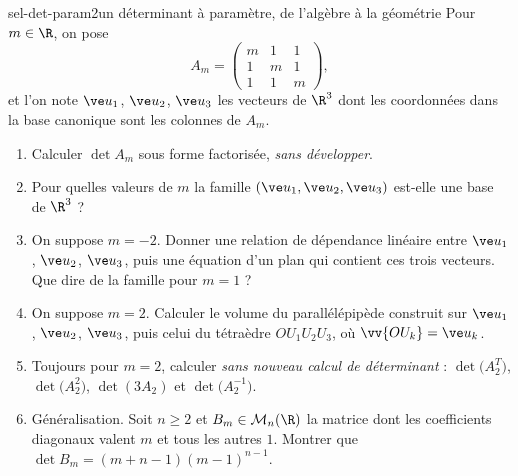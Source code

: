 
\begin{exo}{sel-det-param}{2}{un déterminant à paramètre, de l'algèbre à la géométrie}
Pour $m\in\R$, on pose
\[A_m=\begin{pmatrix}m&1&1\\1&m&1\\1&1&m\end{pmatrix},\]
et l'on note $\ve u_1$, $\ve u_2$, $\ve u_3$ les vecteurs de $\R^3$ dont les coordonnées dans la base canonique sont les colonnes de $A_m$.
\begin{enumerate}
\item Calculer $\det A_m$ sous forme factorisée, \emph{sans développer}.
\item Pour quelles valeurs de $m$ la famille $(\ve u_1,\ve u_2,\ve u_3)$ est-elle une base de $\R^3$ ?
\item On suppose $m=-2$. Donner une relation de dépendance linéaire entre $\ve u_1$, $\ve u_2$, $\ve u_3$, puis une équation d'un plan qui contient ces trois vecteurs. Que dire de la famille pour $m=1$ ?
\item On suppose $m=2$. Calculer le volume du parallélépipède construit sur $\ve u_1$, $\ve u_2$, $\ve u_3$, puis celui du tétraèdre $OU_1U_2U_3$, où $\vv{OU_k}=\ve u_k$.
\item Toujours pour $m=2$, calculer \emph{sans nouveau calcul de déterminant} : $\det\big(A_2^T\big)$, $\det\big(A_2^2\big)$, $\det(3A_2)$ et $\det\big(A_2^{-1}\big)$.
\item Généralisation. Soit $n\geq2$ et $B_m\in\mathcal M_n(\R)$ la matrice dont les coefficients diagonaux valent $m$ et tous les autres $1$. Montrer que $\det B_m=(m+n-1)(m-1)^{n-1}$.
\end{enumerate}
\end{exo}

